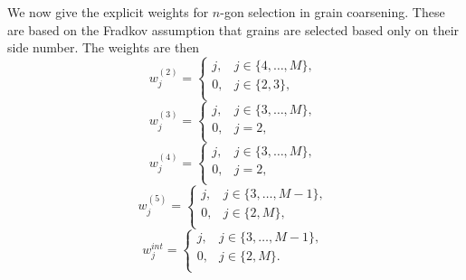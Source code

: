 We now give the explicit weights for $n$-gon selection in grain coarsening.  These are based on the Fradkov assumption that grains are selected based only on their side number. The weights are then
\begin{equation}
w_j^{(2)}= \begin{cases}j, & j \in \{4,\dots, M\},   \ \\
0, & j \in \{2,3\},  \ \\
\end{cases}
\end{equation}
\begin{equation}
w_j^{(3)}= \begin{cases}j, & j \in \{3,\dots, M\},   \ \\
0, & j =2,  \ \\
\end{cases}
\end{equation}
\begin{equation}
w_j^{(4)}= \begin{cases}j, & j \in \{3,\dots, M\},   \ \\
0, & j =2,  \ \\
\end{cases}
\end{equation}
\begin{equation}
w_j^{(5)}= \begin{cases}j, & j \in \{3,\dots, M-1\},   \ \\
0, & j \in\{2,M\},  \ \\
\end{cases}
\end{equation}
\begin{equation}
w_j^{int}= \begin{cases}j, & j \in \{3,\dots, M-1\},   \ \\
0, & j \in\{2,M\}.  \ \\
\end{cases}
\end{equation}

